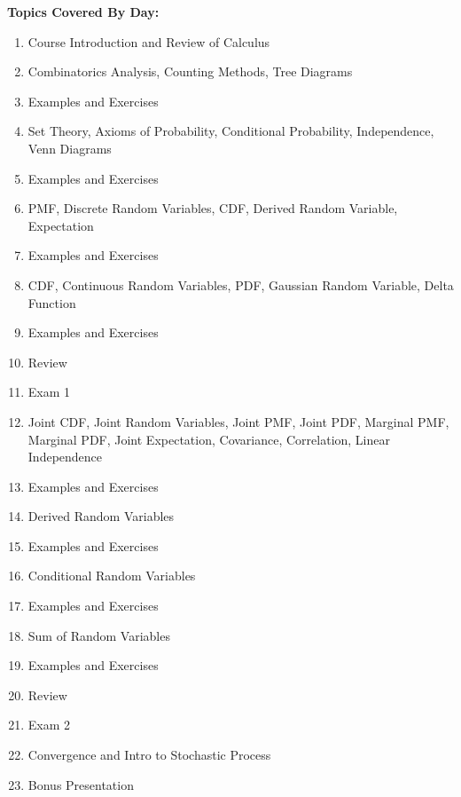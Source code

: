 \documentclass{article}
\begin{document}
\textbf{Topics Covered By Day:} {
    \begin{enumerate}
        \item Course Introduction and Review of Calculus
        \item Combinatorics Analysis, Counting Methods, Tree Diagrams
        \item Examples and Exercises
        \item Set Theory, Axioms of Probability, Conditional Probability, Independence, Venn Diagrams
        \item Examples and Exercises
        \item PMF, Discrete Random Variables, CDF, Derived Random Variable, Expectation
        \item Examples and Exercises
        \item CDF, Continuous Random Variables, PDF, Gaussian Random Variable, Delta Function
        \item Examples and Exercises
        \item Review
        \item Exam 1
        \item Joint CDF, Joint Random Variables, Joint PMF, Joint PDF, Marginal PMF, Marginal PDF, Joint Expectation, Covariance, Correlation, Linear Independence
        \item Examples and Exercises
        \item Derived Random Variables
        \item Examples and Exercises
        \item Conditional Random Variables
        \item Examples and Exercises
        \item Sum of Random Variables
        \item Examples and Exercises
        \item Review
        \item Exam 2
        \item Convergence and Intro to Stochastic Process
        \item Bonus Presentation
    \end{enumerate}
}
\end{document}
